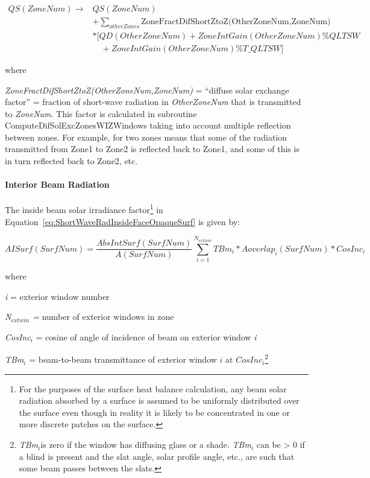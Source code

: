 \begin{equation}
\begin{array}{rl}
   QS(ZoneNum) \to & QS(ZoneNum) \\
                   &+ \sum_{otherZones}\text{ZoneFractDifShortZtoZ(OtherZoneNum,ZoneNum)} \\
                   &* [QD(OtherZoneNum) + ZoneIntGain(OtherZoneNum)\% QLTSW \\
                   &\quad + ZoneIntGain(OtherZoneNum)\% T\_QLTSW]
  \end{array}
\end{equation}

where

\emph{ZoneFractDifShortZtoZ(OtherZoneNum,ZoneNum)} = ``diffuse solar exchange factor'' = fraction of short-wave radiation in \emph{OtherZoneNum} that is transmitted to \emph{ZoneNum}. This factor is calculated in subroutine ComputeDifSolExcZonesWIZWindows taking into account multiple reflection between zones. For example, for two zones means that some of the radiation transmitted from Zone1 to Zone2 is reflected back to Zone1, and some of this is in turn reflected back to Zone2, etc.

\paragraph{Interior Beam Radiation}\label{interior-beam-radiation}

The inside beam solar irradiance factor\footnote{For the purposes of the surface heat balance calculation, any beam solar radiation absorbed by a surface is assumed to be uniformly distributed over the surface even though in reality it is likely to be concentrated in one or more discrete patches on the surface.} in Equation~\ref{eq:ShortWaveRadInsideFaceOpaqueSurf} is given by:

\begin{equation}
AISurf(SurfNum) = \frac{{AbsIntSurf(SurfNum)}}{{A(SurfNum)}}\sum\limits_{i = 1}^{{N_{extwin}}} {TB{m_i}*Aoverla{p_i}(SurfNum)*CosIn{c_i}}
\end{equation}

where

\emph{i} = exterior window number

\emph{N\(_{extwin}\) =} number of exterior windows in zone

\emph{CosInc\(_{i}\)} = cosine of angle of incidence of beam on exterior window \emph{i}

\emph{TBm\(_{i}\)} = beam-to-beam transmittance of exterior window \(i\) at \(CosInc_{i}\)\footnote{\emph{TBm\(_{i}\)}is zero if the window has diffusing glass or a shade. \emph{TBm\(_{i}\)} can be \textgreater{} 0 if a blind is present and the slat angle, solar profile angle, etc., are such that some beam passes between the slats.}

